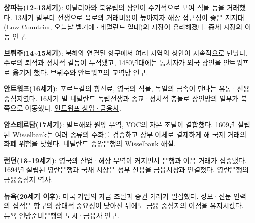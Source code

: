 \documentclass[10pt,a4paper]{article}
\begin{document}
\noindent\textbullet \textbf{샹파뉴(12\textasciitilde{}13세기)}: 이탈리아와 북유럽의 상인이 주기적으로 모여 직물 등을 거래했다. 13세기 말부터 전쟁으로 육로의 거래비용이 높아지자 해상 접근성이 좋은 저지대(Low Countries, 오늘날 벨기에·네덜란드 일대)의 시장이 유리해졌다. \href{https://www.cambridge.org/core/journals/continuity-and-change/article/counts-cities-and-commerce-a-comparative-study-of-the-institutional-foundations-of-international-trade-in-late-medieval-flanders-holland-and-zeeland/37D28A756288A8CCEC41456609F0739C}{중세 시장의 이동 연구}.\par
\noindent\textbullet \textbf{브뤼주(14\textasciitilde{}15세기)}: 북해와 연결된 항구에서 여러 지역의 상인이 지속적으로 만났다. 수로의 퇴적과 정치적 갈등이 누적됐고, 1480년대에는 통치자가 외국 상인을 안트워프로 옮기게 했다. \href{https://www.cambridge.org/core/journals/continuity-and-change/article/counts-cities-and-commerce-a-comparative-study-of-the-institutional-foundations-of-international-trade-in-late-medieval-flanders-holland-and-zeeland/37D28A756288A8CCEC41456609F0739C}{브뤼주와 안트워프의 교역망 연구}.\par
\noindent\textbullet \textbf{안트워프(16세기)}: 포르투갈의 향신료, 영국의 직물, 독일의 금속이 만나는 유통·신용 중심지였다. 16세기 말 네덜란드 독립전쟁과 종교·정치적 충돌로 상인망의 일부가 북쪽으로 이동했다. \href{https://biblio.ugent.be/publication/8701419}{안트워프 상업·금융사}.\par
\noindent\textbullet \textbf{암스테르담(17세기)}: 발트해와 원양 무역, VOC의 자본 조달이 결합했다. 1609년 설립된 Wisselbank는 여러 종류의 주화를 검증하고 장부 이체로 결제하게 해 국제 거래의 화폐 위험을 낮췄다. \href{https://www.dnb.nl/algemeen-nieuws/speech-2025/amsterdam-en-de-nederlandsche-bank-een-verweven-geschiedenis/}{네덜란드 중앙은행의 Wisselbank 해설}.\par
\noindent\textbullet \textbf{런던(18\textasciitilde{}19세기)}: 영국의 산업·해상 무역이 커지면서 은행과 어음 거래가 집중됐다. 1694년 설립된 영란은행과 국채 시장은 정부 신용을 금융시장과 연결했다. \href{https://www.bankofengland.co.uk/-/media/boe/files/quarterly-bulletin/2014/why-is-the-uk-banking-system-so-big-and-is-that-a-problem.pdf}{영란은행의 금융중심지 역사}.\par
\noindent\textbullet \textbf{뉴욕(20세기 이후)}: 미국 기업의 자금 조달과 증권 거래가 밀집했다. 정보·전문 인력의 집적은 항구의 상대적 중요성이 낮아진 뒤에도 금융 중심지의 이점을 유지시켰다. \href{https://resources.newyorkfed.org/medialibrary/media/research/epr/2005/EPRvol11no2.pdf}{뉴욕 연방준비은행의 도시·금융사 연구}.\par
\end{document}
